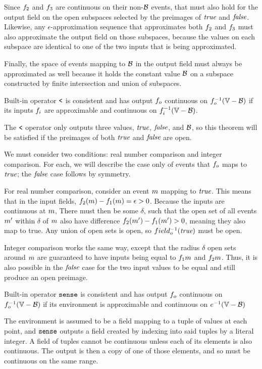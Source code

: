 \documentclass[12pt,a4paper,twoside,openright]{book}
\begin{document}
\begin{appendices}
  Since $f_2$ and $f_3$ are continuous on their non-$\mathcal{B}$ events, that must also hold for the output field on the open subspaces selected by the preimages of $\textit{true}$ and $\textit{false}$.
  Likewise, any $\epsilon$-approximation sequence that approximates both $f_2$ and $f_3$ must also approximate the output field on those subspaces, because the values on each subspace are identical to one of the two inputs that is being approximated.
  
  Finally, the space of events mapping to $\mathcal{B}$ in the output field must always be approximated as well because it holds the constant value $\mathcal{B}$ on a subspace constructed by finite intersection and union of subspaces.

\begin{lem}\label{thm:comparator}
  Built-in operator $\texttt{<}$ is consistent and has output $f_o$ continuous on $\validdomain{\field_o}$ if its inputs $f_i$ are approximable and continuous on $\validdomain{\field_i}$.
\end{lem}
  The $\texttt{<}$ operator only outputs three values, $\textit{true}$, $\textit{false}$, and $\mathcal{B}$, so this theorem will be satisfied if the preimages of both $\textit{true}$ and $\textit{false}$ are open.
  
  We must consider two conditions: real number comparison and integer comparison.  For each, we will describe the case only of events that $f_o$ maps to $\textit{true}$; the $\textit{false}$ case follows by symmetry.
  
  For real number comparison, consider an event $m$ mapping to $\textit{true}$.  This means that in the input fields, $f_2(m) - f_1(m) = \epsilon > 0$.
  Because the inputs are continuous at $m$, There must then be some $\delta$, such that the open set of all events $m'$ within $\delta$ of $m$ also have difference $f_2(m') - f_1(m') > 0$, meaning they also map to true.
  Any union of open sets is open, so $field_o^{-1}(\textit{true})$ must be open.
  
  Integer comparison works the same way, except that the radius $\delta$ open sets around $m$ are guaranteed to have inputs being equal to $f_1{m}$ and $f_2{m}$.  Thus, it is also possible in the $\textit{false}$ case for the two input values to be equal and still produce an open preimage.

\begin{lem}\label{thm:sense}
  Built-in operator $\texttt{sense}$ is consistent and has output $f_o$ continuous on $\validdomain{\field_o}$ if its environment is approximable and continuous on $\validdomain{\environment}$
\end{lem}
  The environment is assumed to be a field mapping to a tuple of values at each point, and $\texttt{sense}$ outputs a field created by indexing into said tuples by a literal integer.
  A field of tuples cannot be continuous unless each of its elements is also continuous.  The output is then a copy of one of those elements, and so must be continuous on the same range.


\end{appendices}
\end{document}
